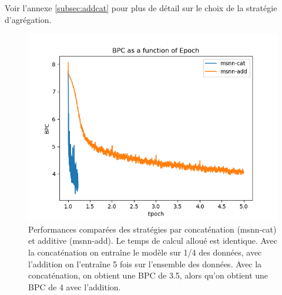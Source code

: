 Voir l'annexe \ref{subsec:addcat} pour plus de détail sur le choix de la stratégie d'agrégation. 

\begin{figure}[H]
	\centering
	\includegraphics[width=\textwidth]{parts/appendix/reports-gmsnn/docs_esteban-latex/test_reports/comparative-bpc-msnn-det-msnn-cat.png}
	\caption[Performances comparées des stratégies additive et par concaténation]{Performances comparées des stratégies par concaténation (msnn-cat) et additive (msnn-add). Le temps de calcul alloué est identique. Avec la concaténation on entraîne le modèle sur 1/4 des données, avec l'addition on l'entraîne 5 fois sur l'ensemble des données. Avec la concaténation, on obtient une BPC de 3.5, alors qu'on obtient une BPC de 4 avec l'addition.}\label{fig:addcat}
\end{figure}